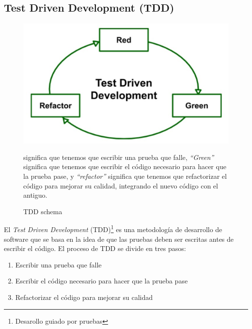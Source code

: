 \newpage
\subsection{Test Driven Development (TDD)}

\begin{figure}[htbp]
   \centering
   \includegraphics{images/07/tdd.png}
   \caption{TDD schema}
    significa que tenemos que escribir una prueba que falle, \textit{\color{green}``Green''} significa que tenemos que escribir el código necesario para hacer que la prueba pase, y \textit{``refactor''} significa que tenemos que refactorizar el código para mejorar su calidad, integrando el nuevo código con el antiguo.
   \label{fig:07/tdd}
\end{figure}

El \textit{Test Driven Development} (TDD)\footnote{Desarollo guiado por pruebas} es una metodología de desarrollo de software que se basa en la idea de que las pruebas deben ser escritas antes de escribir el código. El proceso de TDD se divide en tres pasos:
\begin{enumerate}
   \item Escribir una prueba que falle
   \item Escribir el código necesario para hacer que la prueba pase
   \item Refactorizar el código para mejorar su calidad
\end{enumerate}

